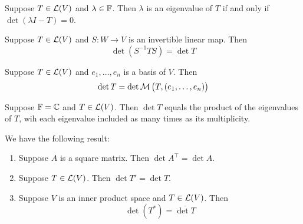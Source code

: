 \documentclass{extarticle}
\begin{document}
\begin{corollary}
    Suppose \(T \in \mathcal{L}(V)\) and \(\lambda \in \mathbb{F}\). Then \(\lambda\) is an eigenvalue of \(T\) if and 
    only if \(\det (\lambda I - T) = 0\).
\end{corollary}



\begin{corollary}
    Suppose \(T \in \mathcal{L}(V)\) and \(S \colon W \to V\) is an invertible linear map. Then 
    \[\det (S^{-1} T S) = \det T\]
\end{corollary}

\begin{corollary}
    Suppose \(T \in \mathcal{L}(V)\) and \(e_1, \ldots, e_n\) is a basis of \(V\). Then 
    \[\det T = \det \mathcal{M} \left( T, (e_1, \ldots, e_n) \right)\]
\end{corollary}

\begin{corollary}
    Suppose \(\mathbb{F} = \mathbb{C}\) and \(T \in \mathcal{L}(V)\). Then \(\det T\) equals the product of the eigenvalues of 
    \(T\), wih each eigenvalue included as many times as its multiplicity. 
\end{corollary}

\begin{corollary}
    We have the following result: 
    \begin{enumerate}[label=(\alph*)]
        \item Suppose \(A\) is a square matrix. Then \(\det A^\top = \det A\). 
        \item Suppose \(T \in \mathcal{L}(V)\). Then \(\det T' = \det T\). 
        \item Suppose \(V\) is an inner product space and \(T \in \mathcal{L}(V)\). Then 
        \[\det (T^*) = \overline{\det T}\]
    \end{enumerate}
\end{corollary}
\end{document}
